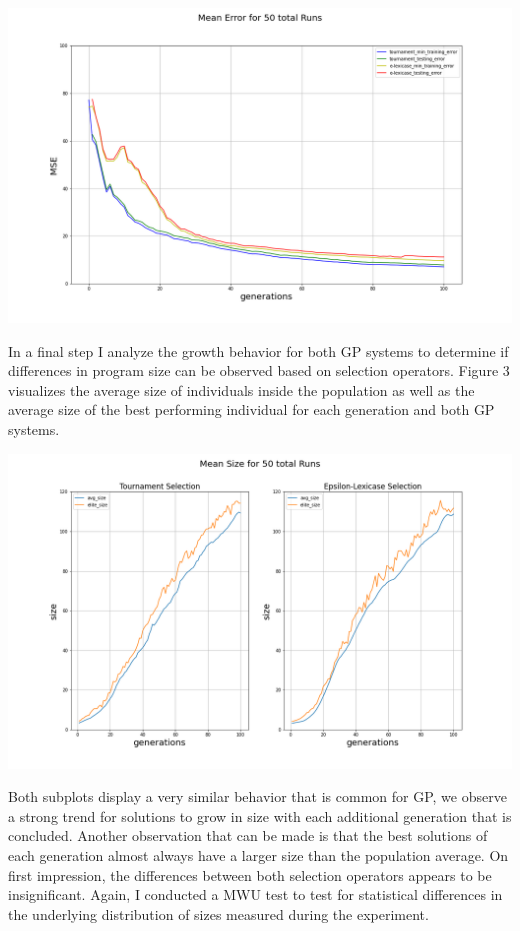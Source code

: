 \documentclass[
  12pt,
]{article}
\let\origfigure\figure
\let\endorigfigure\endfigure
\renewenvironment{figure}[1][2] {
    \expandafter\origfigure\expandafter[H]
} {
    \endorigfigure
}
\begin{document}
\begin{figure}
\centering
\includegraphics{./plots/mean_error_combined.png}
\caption{Mean Errors}
\end{figure}

In a final step I analyze the growth behavior for both GP systems to
determine if differences in program size can be observed based on
selection operators. Figure 3 visualizes the average size of individuals
inside the population as well as the average size of the best performing
individual for each generation and both GP systems.

\begin{figure}
\centering
\includegraphics{./plots/size_subplotted.png}
\caption{Mean Size}
\end{figure}

Both subplots display a very similar behavior that is common for GP, we
observe a strong trend for solutions to grow in size with each
additional generation that is concluded. Another observation that can be
made is that the best solutions of each generation almost always have a
larger size than the population average. On first impression, the
differences between both selection operators appears to be
insignificant. Again, I conducted a MWU test to test for statistical
differences in the underlying distribution of sizes measured during the
experiment.
\end{document}
